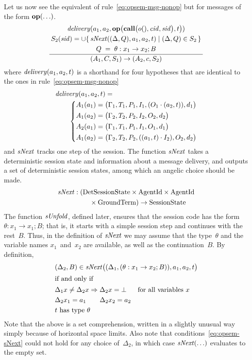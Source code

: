 \documentclass[a4paper,12pt,oneside,fleqn]{book} %
\newcommand{\limp}{\Rightarrow}
\newcommand{\on}[2]{\genfrac{}{}{0pt}{0}{\strut#1}{\strut#2}}
\begin{document}
{Let us now see the equivalent of rule~\eqref{eq:opsem-msg-nonop} but for
messages of the form ${\bf op}(\ldots)$.
\begin{align}
\frac
  {\on{{\it delivery}(a_1,a_2,
    {\bf op}\bigl({\bf call}\bigl(o(),{\it cid},{\it sid}\bigr),t\bigr))}
  {\on{S_2({\it sid})=
        \cup\{\,{\it sNext}((\Delta,Q),a_1,a_2,t)
          \mid(\Delta,Q)\in S_2\,\}}
      {Q\;=\;\theta:x_1\to x_2; B}}}
  {(A_1,C,S_1)\to(A_2,c,S_2)}
\end{align}
where ${\it delivery}(a_1,a_2,t)$ is a shorthand for four hypotheses
that are identical to the ones in rule~\eqref{eq:opsem-msg-nonop}
\begin{align}
\begin{aligned}
&{\it delivery}(a_1,a_2,t) = \\
  &\qquad
  \left\{
  \begin{aligned}
  A_1(a_1)&=\bigl(\Gamma_1,T_1,P_1,I_1,(O_1\cdot(a_2,t)),d_1\bigr) \\
  A_1(a_2)&=\bigl(\Gamma_2,T_2,P_2,I_2,O_2,d_2\bigr) \\
  A_2(a_1)&=\bigl(\Gamma_1,T_1,P_1,I_1,O_1,d_1\bigr) \\
  A_1(a_2)&=\bigl(\Gamma_2,T_2,P_2,((a_1,t)\cdot I_2),O_2,d_2\bigr)
  \end{aligned}
  \right.
\end{aligned}
\end{align}
and $\it sNext$ tracks one step of the session. The function $\it sNext$
takes a deterministic session state and information about a message
delivery, and outputs a set of deterministic session states, among which an
angelic choice should be made.
\begin{align}
\begin{aligned}
{\it sNext} :
  (&{\rm DetSessionState}\times{\rm AgentId}\times{\rm AgentId}
\\
&\quad\times{\rm GroundTerm}) \to {\rm SessionState}
\end{aligned}
\end{align}
The function $\it sUnfold$, defined later, ensures that the session code
has the form $\theta:x_1\to x_1; B$; that is, it starts with a simple
session step and continues with the rest~$B$. Thus, in the definition of
$\it sNext$ we may assume that the type~$\theta$ and the variable names
$x_1$~and~$x_2$ are available, as well as the continuation~$B$. By
definition,
\begin{align}
&(\Delta_2,B) \in {\it sNext}\bigl((\Delta_1,(\theta:x_1\to x_2;B)),a_1,a_2,t\bigr) \\
\intertext{if and only if}
&\begin{aligned}
&\Delta_1x\ne\Delta_2x \limp \Delta_2x=\bot
  &&\text{for all variables $x$} \\
&\Delta_2 x_1=a_1 \qquad \Delta_2 x_2=a_2\\
&\text{$t$ has type $\theta$}
\end{aligned}\label{eq:opsem-sNext}
\end{align}
Note that the above is a set comprehension, written in a slightly unusual
way simply because of horizontal space limits. Also note that
conditions~\eqref{eq:opsem-sNext} could not hold for any choice
of~$\Delta_2$, in which case ${\it sNext}(\ldots)$ evaluates to the empty
set.

}
\end{document}
